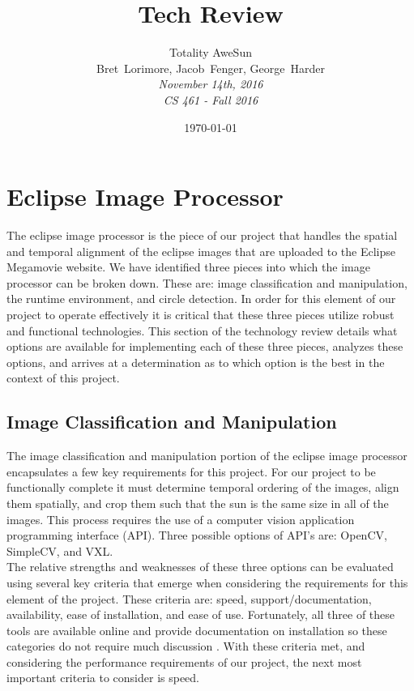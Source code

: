 \documentclass[10pt, onecolumn, draftclsnofoot, letterpaper, compsoc]{IEEEtran}
\title{Tech Review}
\date{\today} %
\author{Totality AweSun \\
		Bret~Lorimore, Jacob~Fenger, George~Harder \\
		\textit{November 14th, 2016 \\
		CS 461 - Fall 2016}}
\begin{document}

\maketitle

\section{Eclipse Image Processor}

The eclipse image processor is the piece of our project that handles the spatial
and temporal alignment of the eclipse images that are uploaded to the Eclipse
Megamovie website. We have identified three pieces into which
the image processor can be broken down. These are: image classification and
manipulation, the runtime environment, and circle detection. In order for this
element of our project to operate effectively it is critical that these three
pieces utilize robust and functional technologies. This section of the
technology review details what options are available for implementing each of
these three pieces, analyzes these options, and arrives at a determination as to
which option is the best in the context of this project.

\subsection{Image Classification and Manipulation}

The image classification and manipulation portion of the eclipse image processor
encapsulates a few key requirements for this project. For our project to be
functionally complete it must determine temporal ordering of the images, align
them spatially, and crop them such that the sun is the same size in all of the
images. This process requires the use of a computer vision application
programming interface (API). Three possible options of API's are: OpenCV,
SimpleCV, and VXL. \\

The relative strengths and weaknesses of these three options can be evaluated
using several key criteria that emerge when considering the requirements for
this element of the project. These criteria are: speed, support/documentation,
availability, ease of installation, and ease of use. Fortunately, all three of
these tools are available online and provide documentation on installation so
these categories do not require much discussion \cite{OCV, VXL, SCV}. With these
criteria met, and considering the performance requirements of our project, the
next most important criteria to consider is speed. \\
\end{document}
